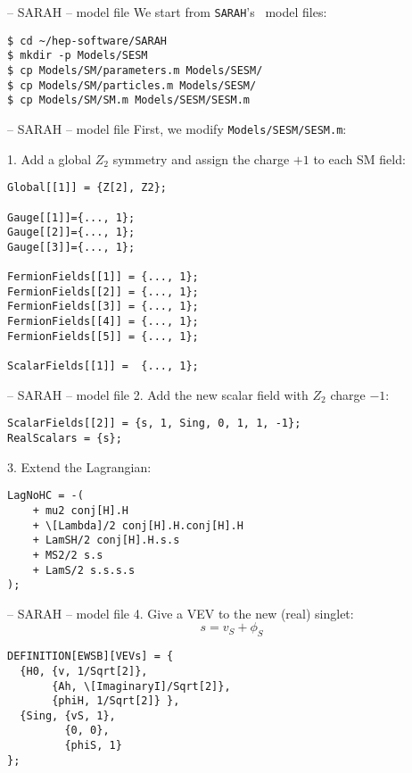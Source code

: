 \documentclass[11pt]{beamer}
\newcommand{\SARAH}{\texttt{SARAH}}
\newcommand{\SM}{\text{SM}}
\begin{document}

\begin{frame}[fragile]{\insertsection -- SARAH -- model file}
  We start from \SARAH's \SM\ model files:
  \begin{lstlisting}
$ cd ~/hep-software/SARAH
$ mkdir -p Models/SESM
$ cp Models/SM/parameters.m Models/SESM/
$ cp Models/SM/particles.m Models/SESM/
$ cp Models/SM/SM.m Models/SESM/SESM.m\end{lstlisting}%
\end{frame}


\begin{frame}[fragile]{\insertsection -- SARAH -- model file}
  First, we modify \texttt{Models/SESM/SESM.m}:

  \medskip

  1. Add a global $Z_2$ symmetry and assign the charge $+1$ to each SM
  field:
  \begin{lstlisting}
Global[[1]] = {Z[2], Z2};

Gauge[[1]]={..., 1};
Gauge[[2]]={..., 1};
Gauge[[3]]={..., 1};

FermionFields[[1]] = {..., 1};  
FermionFields[[2]] = {..., 1};
FermionFields[[3]] = {..., 1};
FermionFields[[4]] = {..., 1};
FermionFields[[5]] = {..., 1};

ScalarFields[[1]] =  {..., 1};\end{lstlisting}
\end{frame}


\begin{frame}[fragile]{\insertsection -- SARAH -- model file}
  2. Add the new scalar field with $Z_2$ charge $-1$:
  \begin{lstlisting}
ScalarFields[[2]] = {s, 1, Sing, 0, 1, 1, -1};
RealScalars = {s};\end{lstlisting}
  3. Extend the Lagrangian:
  \begin{lstlisting}
LagNoHC = -(
    + mu2 conj[H].H
    + \[Lambda]/2 conj[H].H.conj[H].H
    + LamSH/2 conj[H].H.s.s
    + MS2/2 s.s
    + LamS/2 s.s.s.s
);\end{lstlisting}
\end{frame}


\begin{frame}[fragile]{\insertsection -- SARAH -- model file}
  4. Give a VEV to the new (real) singlet:
  \begin{equation*}
    s = v_S + \phi_S
  \end{equation*}
  \begin{lstlisting}
DEFINITION[EWSB][VEVs] = {
  {H0, {v, 1/Sqrt[2]},
       {Ah, \[ImaginaryI]/Sqrt[2]},
       {phiH, 1/Sqrt[2]} },
  {Sing, {vS, 1},
         {0, 0},
         {phiS, 1}
};\end{lstlisting}
\end{frame}
\end{document}
